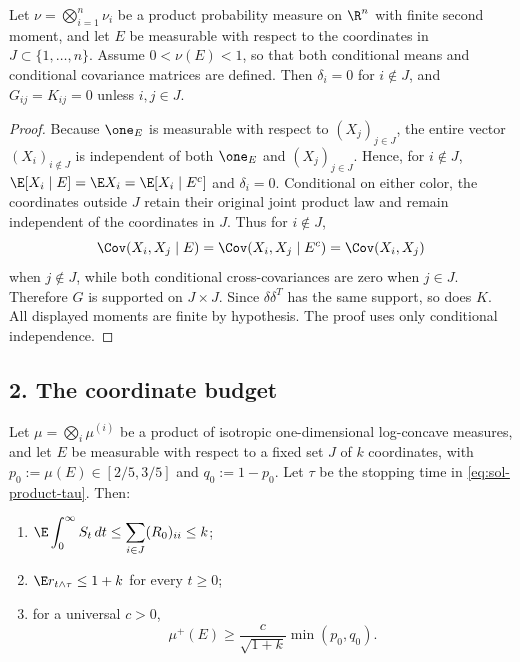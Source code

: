 \documentclass[../main.tex]{subfiles}
\begin{document}
\begin{lemma}[= Lemma~\ref{lem:block}]
\label{lem:sol-block}
Let $\nu=\bigotimes_{i=1}^n\nu_i$ be a product probability measure on $\R^n$ with finite
second moment, and let $E$ be measurable with respect to the coordinates in
$J\subset\{1,\dots,n\}$.  Assume $0<\nu(E)<1$, so that both conditional means and
conditional covariance matrices are defined.  Then $\delta_i=0$ for $i\notin J$, and
$G_{ij}=K_{ij}=0$ unless $i,j\in J$.
\end{lemma}

\begin{proof}
Because $\one_E$ is measurable with respect to $(X_j)_{j\in J}$, the entire vector
$(X_i)_{i\notin J}$ is independent of both $\one_E$ and $(X_j)_{j\in J}$.  Hence, for
$i\notin J$,
$\E[X_i\mid E]=\E X_i=\E[X_i\mid E^c]$ and $\delta_i=0$.  Conditional on either color, the
coordinates outside $J$ retain their original joint product law and remain independent of the
coordinates in $J$.  Thus for $i\notin J$,
\[
  \Cov(X_i,X_j\mid E)=\Cov(X_i,X_j\mid E^c)=\Cov(X_i,X_j)
\]
when $j\notin J$, while both conditional cross-covariances are zero when $j\in J$.  Therefore
$G$ is supported on $J\times J$.  Since $\delta\delta^T$ has the same support, so does $K$.
All displayed moments are finite by hypothesis.  The proof uses only conditional independence.
\end{proof}

\subsection*{2. The coordinate budget}

\begin{theorem}[= Theorem~\ref{thm:budget}]
\label{thm:sol-budget}
Let $\mu=\bigotimes_i\mu^{(i)}$ be a product of isotropic one-dimensional log-concave measures,
and let $E$ be measurable with respect to a fixed set $J$ of $k$ coordinates, with
$p_0:=\mu(E)\in[2/5,3/5]$ and $q_0:=1-p_0$.  Let $\tau$ be the stopping time in
\eqref{eq:sol-product-tau}.  Then:
\begin{enumerate}[label=(\roman*),leftmargin=2.2em]
  \item $\displaystyle\E\int_0^\infty S_t\,dt
        \le\sum_{i\in J}(R_0)_{ii}\le k$;
  \item $\E r_{t\wedge\tau}\le1+k$ for every $t\ge0$;
  \item for a universal $c>0$,
        \[
          \mu^+(E)\ge\frac{c}{\sqrt{1+k}}\min(p_0,q_0).
        \]
\end{enumerate}
\end{theorem}
\end{document}
